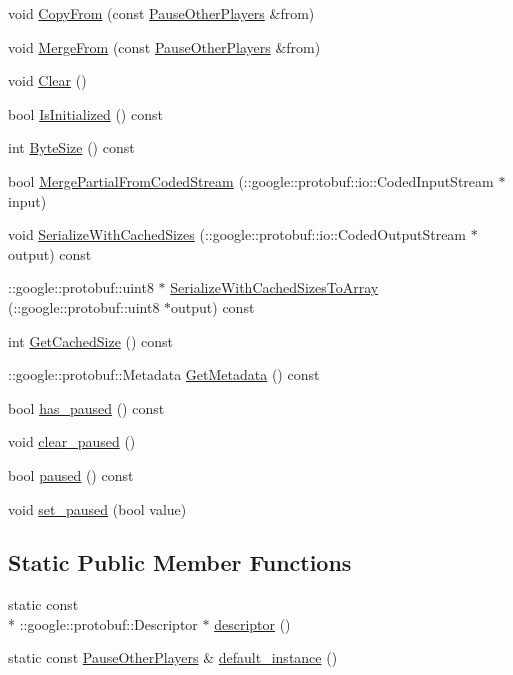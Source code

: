 \begin{DoxyCompactItemize}
void \hyperlink{class_pause_other_players_a39f245baeca634ba592ec1f199d87d8a}{Copy\-From} (const \hyperlink{class_pause_other_players}{Pause\-Other\-Players} \&from)
\item 
void \hyperlink{class_pause_other_players_a11a8b7c8f85f83e6173a78dda661d246}{Merge\-From} (const \hyperlink{class_pause_other_players}{Pause\-Other\-Players} \&from)
\item 
void \hyperlink{class_pause_other_players_a2533a4232c5aa13911ed738a3d7c0e0a}{Clear} ()
\item 
bool \hyperlink{class_pause_other_players_ab959487ba39f0f04be65a691486a5f09}{Is\-Initialized} () const 
\item 
int \hyperlink{class_pause_other_players_a822d5b333583bce0d014a39edeb0f933}{Byte\-Size} () const 
\item 
bool \hyperlink{class_pause_other_players_a1e0909de2b4d416c2139b3352fb5be06}{Merge\-Partial\-From\-Coded\-Stream} (\-::google\-::protobuf\-::io\-::\-Coded\-Input\-Stream $\ast$input)
\item 
void \hyperlink{class_pause_other_players_a0d11eee8c31de806930b34cc20ba4ca0}{Serialize\-With\-Cached\-Sizes} (\-::google\-::protobuf\-::io\-::\-Coded\-Output\-Stream $\ast$output) const 
\item 
\-::google\-::protobuf\-::uint8 $\ast$ \hyperlink{class_pause_other_players_a946433ba2849ab63b3f6824bbcdd0280}{Serialize\-With\-Cached\-Sizes\-To\-Array} (\-::google\-::protobuf\-::uint8 $\ast$output) const 
\item 
int \hyperlink{class_pause_other_players_ac74be5a0f00009b5a21590c2e8c83987}{Get\-Cached\-Size} () const 
\item 
\-::google\-::protobuf\-::\-Metadata \hyperlink{class_pause_other_players_afbca7aa83badf6f3c59be35869d1b75c}{Get\-Metadata} () const 
\item 
bool \hyperlink{class_pause_other_players_aafa7dd371c5b5f3810138683a93f7ed6}{has\-\_\-paused} () const 
\item 
void \hyperlink{class_pause_other_players_ac15c76196cd209d557c60f2d41f4602d}{clear\-\_\-paused} ()
\item 
bool \hyperlink{class_pause_other_players_a519e1195e02787240129e18ba893faaa}{paused} () const 
\item 
void \hyperlink{class_pause_other_players_ac6c380bdd56e7959a3d01ef49aacd0cc}{set\-\_\-paused} (bool value)
\end{DoxyCompactItemize}
\subsection*{Static Public Member Functions}
\begin{DoxyCompactItemize}
\item 
static const \\*
\-::google\-::protobuf\-::\-Descriptor $\ast$ \hyperlink{class_pause_other_players_a54176046797703d917a3f244fe65bc2b}{descriptor} ()
\item 
static const \hyperlink{class_pause_other_players}{Pause\-Other\-Players} \& \hyperlink{class_pause_other_players_aa7aee4f6cedf2aded36cbc684a4040c6}{default\-\_\-instance} ()
\end{DoxyCompactItemize}
